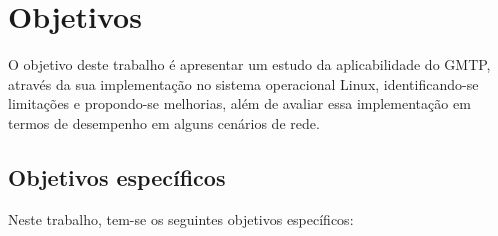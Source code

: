 % 
% 
% 
% 
\section{Objetivos}
\label{sec:objetivos}


O objetivo deste trabalho é apresentar um estudo da aplicabilidade do GMTP, através da sua implementação no sistema operacional Linux, identificando-se limitações e propondo-se melhorias, além de avaliar essa implementação em termos de desempenho em alguns cenários de rede. 

\subsection{Objetivos específicos}
\label{sec:obj-espec}

Neste trabalho, tem-se os seguintes objetivos específicos:

